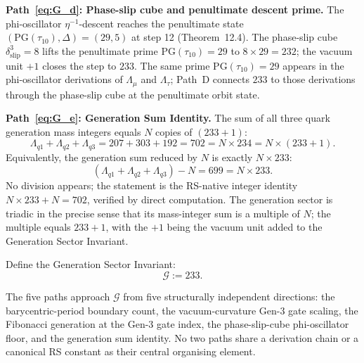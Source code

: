 \documentclass[11pt, letterpaper]{article}
\theoremstyle{definition}
\theoremstyle{plain}
\begin{document}
\begin{rsbox}
\textbf{Path~\eqref{eq:G_d}: Phase-slip cube and penultimate descent prime.}
The phi-oscillator $\eta^{-1}$-descent reaches the penultimate state
$(\mathrm{PG}(\tau_{10}), \Delta) = (29, 5)$ at step 12 (Theorem~12.4). The phase-slip
cube $\delta_\mathrm{slip}^3 = 8$ lifts the penultimate prime $\mathrm{PG}(\tau_{10})
= 29$ to $8 \times 29 = 232$; the vacuum unit $+1$ closes the step to $233$. The
same prime $\mathrm{PG}(\tau_{10}) = 29$ appears in the phi-oscillator derivations of
$\Lambda_\mu$ and $\Lambda_\tau$; Path~D connects $233$ to those derivations through
the phase-slip cube at the penultimate orbit state.

\textbf{Path~\eqref{eq:G_e}: Generation Sum Identity.}
The sum of all three quark generation mass integers equals $N$ copies of $(233 + 1)$:
\[
    \Lambda_{q1} + \Lambda_{q2} + \Lambda_{q3}
    = 207 + 303 + 192 = 702 = N \times 234 = N \times (233 + 1).
\]
Equivalently, the generation sum reduced by $N$ is exactly $N \times 233$:
\[
    (\Lambda_{q1} + \Lambda_{q2} + \Lambda_{q3}) - N = 699 = N \times 233.
\]
No division appears; the statement is the RS-native integer identity $N \times 233
+ N = 702$, verified by direct computation. The generation sector is triadic in the
precise sense that its mass-integer sum is a multiple of $N$; the multiple equals
$233 + 1$, with the $+1$ being the vacuum unit added to the Generation Sector
Invariant.

\medskip
Define the Generation Sector Invariant:
\begin{equation}
    \mathcal{G} := 233.
\end{equation}

The five paths approach $\mathcal{G}$ from five structurally independent directions:
the barycentric-period boundary count, the vacuum-curvature Gen-3 gate scaling, the
Fibonacci generation at the Gen-3 gate index, the phase-slip-cube phi-oscillator floor,
and the generation sum identity. No two paths share a derivation chain or a canonical
RS constant as their central organising element.
\end{rsbox}
\end{document}
